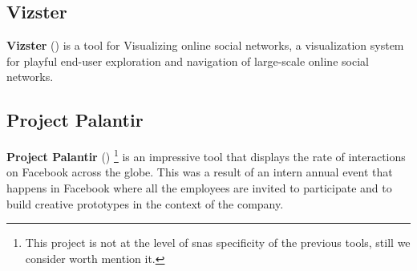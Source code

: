 \subsection{Vizster}

\textbf{Vizster} (\cite{heer2005vizster}) is a tool for Visualizing online social networks, a visualization system for playful end-user exploration and navigation of large-scale online social networks.

\subsection{Project Palantir}

\textbf{Project Palantir} (\cite{project-palantir}) \footnote{This project is not at the level of \glspl{sna} specificity of the previous tools, still we consider worth mention it.} is an impressive tool that displays the rate of interactions on Facebook across the globe. This was a result of an intern annual event that happens in Facebook where all the employees are invited to participate and to build creative prototypes in the context of the company.